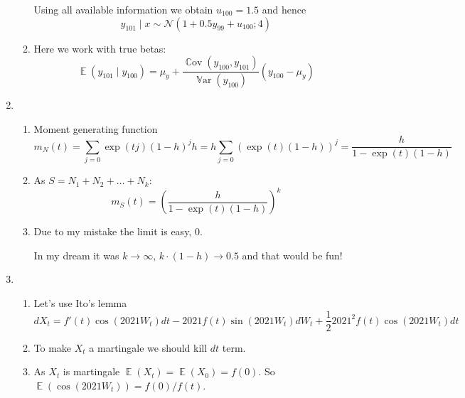 \documentclass[12pt]{article}
\DeclareMathOperator{\Cov}{\mathbb{C}ov}
\DeclareMathOperator{\E}{\mathbb{E}}
\DeclareMathOperator{\Var}{\mathbb{V}ar}
\newcommand{\cN}{\mathcal{N}}
\begin{document}
\begin{enumerate}
\begin{enumerate}
    Using all available information we obtain $u_{100}  = 1.5$ and hence
    \[
    y_{101} \mid x \sim  \cN(1 + 0.5 y_{99} + u_{100} ; 4)
    \]

    \item Here we work with true betas:
    \[
    \E(y_{101} \mid y_{100}) = \mu_y + \frac{\Cov(y_{100}, y_{101})}{\Var(y_{100})}(y_{100} - \mu_y)    
    \]

\end{enumerate}
\item \begin{enumerate}
    \item Moment generating function
\[
m_N(t) = \sum_{j=0} \exp(tj) (1-h)^j h = h \sum_{j=0} (\exp(t) (1-h))^j = \frac{h}{1 - \exp(t) (1 - h)}  
\]
\item As $S = N_1 + N_2 + \ldots + N_k$:
\[
m_S(t) =  \left( \frac{h}{1 - \exp(t) (1 - h)} \right)^k
\]
\item Due to my mistake the limit is easy, $0$. 

In my dream it was $k\to \infty$, $k \cdot (1 - h) \to 0.5$ and that would be fun!

\end{enumerate}

\item \begin{enumerate}
    \item Let's use Ito's lemma
    \[
    dX_t = f'(t) \cos (2021 W_t) dt - 2021 f(t) \sin (2021 W_t) dW_t + \frac{1}{2}2021^2 f(t) \cos(2021 W_t) dt    
    \]
    \item To make $X_t$ a martingale we should kill $dt$ term. 
    \item As $X_t$ is martingale $\E(X_t) = \E(X_0) = f(0)$.
    So $\E(\cos (2021 W_t)) = f(0) / f(t)$.
\end{enumerate}

\end{enumerate}
\end{document}
